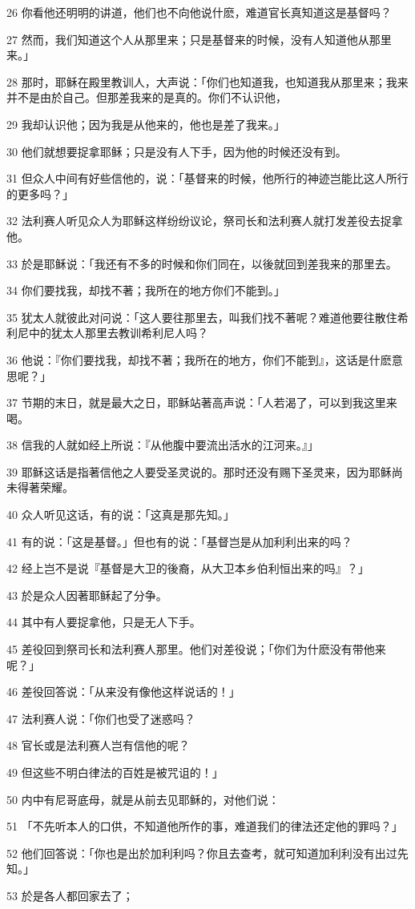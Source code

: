 \par 26 你看他还明明的讲道，他们也不向他说什麽，难道官长真知道这是基督吗？
\par 27 然而，我们知道这个人从那里来；只是基督来的时候，没有人知道他从那里来。」
\par 28 那时，耶稣在殿里教训人，大声说：「你们也知道我，也知道我从那里来；我来并不是由於自己。但那差我来的是真的。你们不认识他，
\par 29 我却认识他；因为我是从他来的，他也是差了我来。」
\par 30 他们就想要捉拿耶稣；只是没有人下手，因为他的时候还没有到。
\par 31 但众人中间有好些信他的，说：「基督来的时候，他所行的神迹岂能比这人所行的更多吗？」
\par 32 法利赛人听见众人为耶稣这样纷纷议论，祭司长和法利赛人就打发差役去捉拿他。
\par 33 於是耶稣说：「我还有不多的时候和你们同在，以後就回到差我来的那里去。
\par 34 你们要找我，却找不著；我所在的地方你们不能到。」
\par 35 犹太人就彼此对问说：「这人要往那里去，叫我们找不著呢？难道他要往散住希利尼中的犹太人那里去教训希利尼人吗？
\par 36 他说：『你们要找我，却找不著；我所在的地方，你们不能到』，这话是什麽意思呢？」
\par 37 节期的末日，就是最大之日，耶稣站著高声说：「人若渴了，可以到我这里来喝。
\par 38 信我的人就如经上所说：『从他腹中要流出活水的江河来。』」
\par 39 耶稣这话是指著信他之人要受圣灵说的。那时还没有赐下圣灵来，因为耶稣尚未得著荣耀。
\par 40 众人听见这话，有的说：「这真是那先知。」
\par 41 有的说：「这是基督。」但也有的说：「基督岂是从加利利出来的吗？
\par 42 经上岂不是说『基督是大卫的後裔，从大卫本乡伯利恒出来的吗』？」
\par 43 於是众人因著耶稣起了分争。
\par 44 其中有人要捉拿他，只是无人下手。
\par 45 差役回到祭司长和法利赛人那里。他们对差役说；「你们为什麽没有带他来呢？」
\par 46 差役回答说：「从来没有像他这样说话的！」
\par 47 法利赛人说：「你们也受了迷惑吗？
\par 48 官长或是法利赛人岂有信他的呢？
\par 49 但这些不明白律法的百姓是被咒诅的！」
\par 50 内中有尼哥底母，就是从前去见耶稣的，对他们说：
\par 51 「不先听本人的口供，不知道他所作的事，难道我们的律法还定他的罪吗？」
\par 52 他们回答说：「你也是出於加利利吗？你且去查考，就可知道加利利没有出过先知。」
\par 53 於是各人都回家去了；

